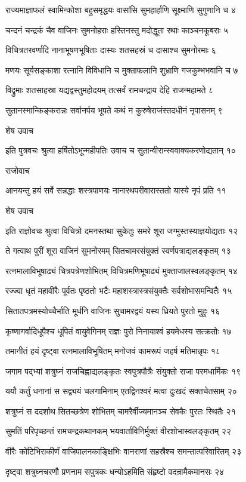 राज्यमाज्ञाफलं स्वामिन्कोशा बहुसमृद्धयः
वासांसि सुमहार्हाणि सूक्ष्माणि सुगुणानि च ४

चन्दनं चन्द्रकं चैव वाजिनः सुमनोहराः
हस्तिनस्तु मदोद्धूता रथाः काञ्चनकूबराः ५

विचित्रतरवर्णादि नानाभूषणभूषिताः
दास्यः शतसहस्रं च दासाश्च सुमनोरमाः ६

मणयः सूर्यसङ्काशा रत्नानि विविधानि च
मुक्ताफलानि शुभ्राणि गजकुम्भभवानि च ७

विद्रुमाः शतसाहस्रा यद्यद्वस्तुमहोदयम्
तत्सर्वं रामचन्द्राय देहि राजन्महामते ८

सुतानस्मान्किङ्करान्नः सर्वानर्पय भूपते
कथं न कुरुषेराजंस्तदधीनं नृपासनम् ९

शेष उवाच

इति पुत्रवचः श्रुत्वा हर्षितोऽभून्महीपतिः
उवाच च सुतान्वीरान्स्ववाक्यकरणोद्यतान् १०

राजोवाच

आनयन्तु हयं सर्वे सन्नद्धाः शस्त्रपाणयः
नानारथपरीवारास्ततो यास्ये नृपं प्रति ११

शेष उवाच

इति राज्ञोवचः श्रुत्वा विचित्रो दमनस्तथा
सुकेतुः समरे शूरा जग्मुस्तस्याज्ञयोद्यताः १२

ते गत्वाथ पुरीं शूरा वाजिनं सुमनोरमम्
सितचामरसंयुक्तं स्वर्णपत्राद्यलङ्कृतम् १३

रत्नमालाविभूषाढ्यं चित्रपत्रेणशोभितम्
विचित्रमणिभूषाढ्यं मुक्ताजालस्वलङ्कृतम् १४

रज्ज्वा धृतं महावीरैः पूर्वतः पृष्ठतो भटैः
महाशस्त्रास्त्रसंयुक्तैः सर्वशोभासमन्वितैः १५

सितातपत्रमस्योच्चैर्भाति मूर्धनि वाजिनः
सुचामरद्वयं यस्य ध्रियते पुरतो मुहुः १६

कृष्णागर्वादिधूपैश्च धूपितं वायुवेगिनम्
राज्ञः पुरो निनायाश्वं हयमेधस्य सत्क्रतोः १७

तमानीतं हयं दृष्ट्वा रत्नमालाविभूषितम्
मनोजवं कामरूपं जहर्ष मतिमान्नृपः १८

जगाम पद्भ्यां शत्रुघ्नं राजचिह्नाद्यलङ्कृतः
स्वपुत्रपौत्रैः संयुक्तो राजा परमधार्मिकः १९

ययौ कर्तुं धनानां स सद्व्ययं चलगामिनाम्
एतद्विनश्वरं मत्वा दुःखदं सक्तचेतसाम् २०

शत्रुघ्नं स ददर्शाथ सितच्छत्रेण शोभितम्
चामरैर्वीज्यमानञ्च सेवकैः पुरतः स्थितैः २१

सुमतिं परिपृच्छन्तं रामचन्द्रकथानकम्
भयवार्ताविनिर्मुक्तं वीरशोभास्वलङ्कृतम् २२

वीरैः कोटिभिराकीर्णं वाजिपालनकाङ्क्षिभिः
वानराणां सहस्रैश्च समन्तात्परिवारितम् २३

दृष्ट्वा शत्रुघ्नचरणौ प्रणनाम सपुत्रकः
धन्योऽहमिति संहृष्टो वदन्रामैकमानसः २४

